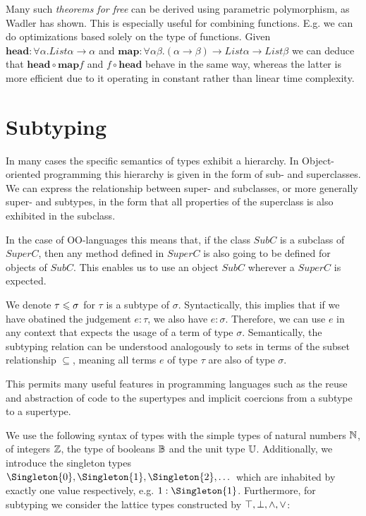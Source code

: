 Many such \emph{theorems for free} can be derived using parametric polymorphism, as Wadler has shown. \cite{wadlertheorems}
This is especially useful for combining functions.
E.g. we can do optimizations based solely on the type of functions.
Given $\mathbf{head}  : \forall \alpha. \mathit{List } \alpha \to \alpha$ and $\mathbf{map} : \forall \alpha \beta. (\alpha \to \beta) \to \mathit{List } \alpha \to \mathit{List } \beta$
we can deduce that $\mathbf{head} \circ \mathbf{map} f$ and $f \circ \mathbf{head}$ behave in the same way, whereas the latter is more efficient due to it operating in constant rather than linear time complexity.

\section{Subtyping}\label{sec:subtyping}

In many cases the specific semantics of types exhibit a hierarchy.
In Object-oriented programming this hierarchy is given in the form of sub- and superclasses.
We can express the relationship between super- and subclasses, or more generally super- and subtypes,
in the form that all properties of the superclass is also exhibited in the subclass. \cite{subtyping}

In the case of OO-languages this means that, if the class $\mathit{SubC}$ is a subclass of $\mathit{SuperC}$,
then any method defined in $\mathit{SuperC}$ is also going to be defined for objects of $\mathit{SubC}$.
This enables us to use an object $\mathit{SubC}$ wherever a $\mathit{SuperC}$ is expected.

We denote $\tau \leqslant \sigma$ for $\tau$ is a subtype of $\sigma$.
Syntactically, this implies that if we have obatined the judgement $e : \tau$, we also have $e : \sigma$.
Therefore, we can use $e$ in any context that expects the usage of a term of type $\sigma$.
Semantically, the subtyping relation can be understood analogously to sets in terms of the subset relationship $\subseteq$,
meaning all terms $e$ of type $\tau$ are also of type $\sigma$.
\cite{reynolds_1998}

This permits many useful features in programming languages such as the reuse and abstraction of code to the supertypes and implicit coercions from a subtype to a supertype.


We use the following syntax of types with the simple types of natural numbers $\mathbb{N}$, of integers $\mathbb{Z}$, the type of booleans $\mathbb{B}$ and the unit type $\mathbb{U}$.
Additionally, we introduce the singleton types $\Singleton{0}, \Singleton{1}, \Singleton{2}, \dots$ which are inhabited by exactly one value respectively, e.g. $1 : \Singleton{1}$.
Furthermore, for subtyping we consider the lattice types constructed by $\top, \bot, \wedge, \vee$:

